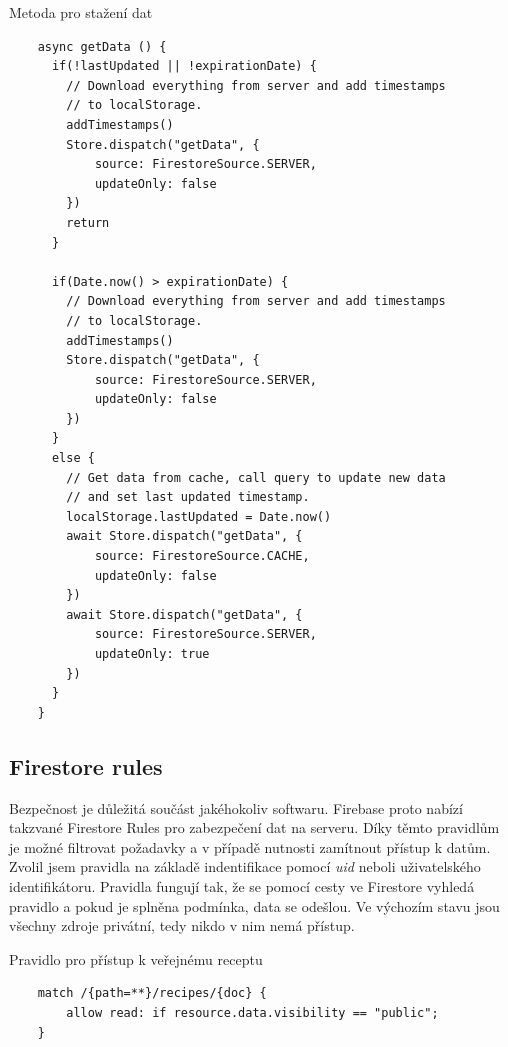 \begin{listing}[H]
    \caption{Metoda pro stažení dat}
    \begin{verbatim}
    async getData () {
      if(!lastUpdated || !expirationDate) {
        // Download everything from server and add timestamps
        // to localStorage.
        addTimestamps()
        Store.dispatch("getData", {
            source: FirestoreSource.SERVER,
            updateOnly: false
        })
        return
      }

      if(Date.now() > expirationDate) {
        // Download everything from server and add timestamps
        // to localStorage.
        addTimestamps()
        Store.dispatch("getData", {
            source: FirestoreSource.SERVER,
            updateOnly: false
        })
      }
      else {
        // Get data from cache, call query to update new data
        // and set last updated timestamp.
        localStorage.lastUpdated = Date.now()
        await Store.dispatch("getData", {
            source: FirestoreSource.CACHE,
            updateOnly: false
        })
        await Store.dispatch("getData", {
            source: FirestoreSource.SERVER,
            updateOnly: true
        })
      }
    }
    \end{verbatim}
\end{listing}

\newpage

\subsection{Firestore rules}
Bezpečnost je důležitá součást jakéhokoliv softwaru. Firebase proto nabízí takzvané Firestore Rules pro zabezpečení dat na serveru.
Díky těmto pravidlům je možné filtrovat požadavky a v případě nutnosti zamítnout přístup k datům. Zvolil jsem pravidla na základě
indentifikace pomocí \emph{uid} neboli uživatelského identifikátoru. Pravidla fungují tak, že se pomocí cesty ve Firestore vyhledá
pravidlo a pokud je splněna podmínka, data se odešlou. Ve výchozím stavu jsou všechny zdroje privátní, tedy nikdo v nim nemá přístup.

\begin{listing}[H]
    \caption{Pravidlo pro přístup k veřejnému receptu}
    \begin{verbatim}
    match /{path=**}/recipes/{doc} {
        allow read: if resource.data.visibility == "public";
    }
    \end{verbatim}
\end{listing}

